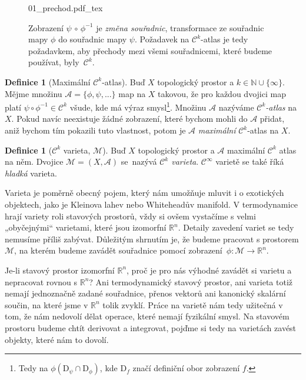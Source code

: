 \documentclass{article}
\newcommand{\incfig}[1]{%
    \def\svgwidth{\columnwidth}
    {#1.pdf_tex}
}
\theoremstyle{definition}
\newtheorem{definition}[theorem]{Definice}
\newcommand{\const}[1]{\mathrm{#1}}
\newcommand{\R}{\mathbb{R}}
\def\Cont{\mathcal{C}}
\def\Atlas{\mathcal{A}}
\def\Manif{\mathcal{M}}
\begin{document}
\vspace{3\baselineskip}

\begin{figure}[h!]
    \centering
    \incfig{01_prechod}
    \caption{Zobrazení $\psi \, \circ \, \phi^{-1}$ je \textit{změna souřadnic}, transformace ze souřadnic mapy $\phi$ do souřadnic mapy $\psi$. Požadavek na $\Cont^k$-atlas je tedy požadavkem, aby přechody mezi všemi souřadnicemi, které budeme používat, byly~$\Cont^k$.}
    \label{obr:prechod}
\end{figure}

\pagebreak

\begin{definition}[Maximální $\Cont^k$-atlas]
Buď $X$ topologický prostor a $k \in \mathbb{N} \cup \{\infty\}$. Mějme množinu $\Atlas = \{\phi, \psi, ... \}$ map na $X$ takovou, že pro každou dvojici map platí $\psi \circ \phi^{-1} \in \Cont^k$ všude, kde má výraz smysl\footnote{Tedy na $\phi(\const{D}_\psi \cap \const{D}_\phi)$, kde $\const{D}_f$ značí definiční obor zobrazení $f$.}. Množinu $\Atlas$ nazýváme \textit{$\Cont^k$-atlas} na $X$. Pokud navíc neexistuje žádné zobrazení, které bychom mohli do $\Atlas$ přidat, aniž bychom tím pokazili tuto vlastnost, potom je $\Atlas$ \textit{maximální} $\Cont^k$-atlas na $X$.
\end{definition}

\begin{definition}[$\Cont^k$ varieta, $\Manif$]
Buď $X$ topologický prostor a $\Atlas$ maximální $\Cont^k$ atlas na něm. Dvojice $\Manif = (X, \Atlas)$ se~nazývá \textit{$\Cont^k$ varieta}. $\Cont^\infty$ varietě se také říká \textit{hladká} varieta.
\end{definition}

Varieta je poměrně obecný pojem, který nám umožňuje mluvit i o exotických objektech, jako je Kleinova lahev nebo Whiteheadův manifold. V termodynamice hrají variety roli stavových prostorů, vždy si ovšem vystačíme s velmi „obyčejnými“ varietami, které jsou izomorfní $\R^n$. Detaily zavedení variet se tedy nemusíme příliš zabývat. Důležitým shrnutím je, že budeme pracovat s prostorem $\Manif$, na kterém budeme zavádět souřadnice pomocí zobrazení~${\phi: \Manif \to \R^n}$.

\medskip

Je-li stavový prostor izomorfní $\R^n$, proč je pro nás výhodné zavádět si varietu a nepracovat rovnou s $\R^n$? Ani termodynamický stavový prostor, ani varieta totiž nemají jednoznačně zadané souřadnice, přenos vektorů ani kanonický skalární součin, na které jsme v $\R^n$ tolik zvyklí. Práce na varietě nám tedy užitečná v tom, že nám nedovolí dělat operace, které nemají fyzikální smysl. Na stavovém prostoru budeme chtít derivovat a integrovat, pojďme si tedy na varietách zavést objekty, které nám to dovolí.
\end{document}

